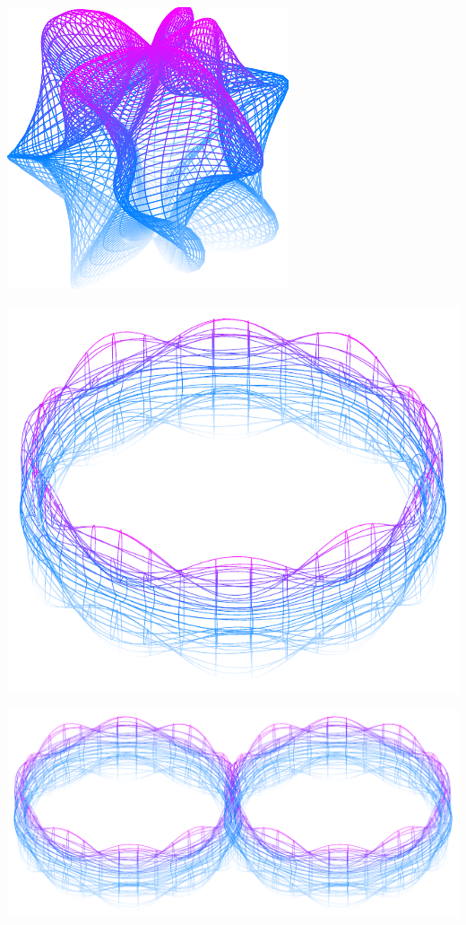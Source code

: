 \documentclass[11pt,openany]{article}
\begin{document}
\vfill
\begin{center}
\begin{minipage}{.32\textwidth}\centering
	\includegraphics[scale=.8]{../tikz/grad-math-tikz-pdf/sphere3.pdf}
\end{minipage}\hfill
\begin{minipage}{.32\textwidth}\centering
	\includegraphics[scale=.45]{../tikz/grad-math-tikz-pdf/torus5.pdf}
\end{minipage}\hfill
\begin{minipage}{.32\textwidth}\centering
	\includegraphics[scale=.3]{../tikz/grad-math-tikz-pdf/double-torus4.pdf}
\end{minipage}
\end{center}
\end{document}
